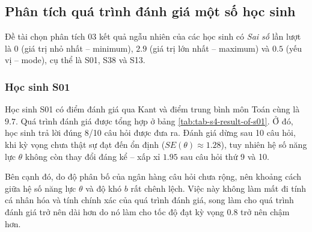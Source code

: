 \subsection{Phân tích quá trình đánh giá một số học sinh}

Đề tài chọn phân tích 03 kết quả ngẫu nhiên của các học sinh có \textit{Sai số} lần lượt là $0$ (giá trị nhỏ nhất – minimum), $2.9$ (giá trị lớn nhất – maximum) và $0.5$ (yếu vị – mode), cụ thể là S01, S38 và S13.\par

\subsubsection{Học sinh S01}

Học sinh S01 có điểm đánh giá qua Kant và điểm trung bình môn Toán cùng là $9.7$. Quá trình đánh giá được tổng hợp ở bảng \ref{tab:tab-s4-result-of-s01}. Ở đó, học sinh trả lời đúng 8/10 câu hỏi được đưa ra. Đánh giá dừng sau 10 câu hỏi, khi kỳ vọng chưa thật sự đạt đến ổn định ($SE(\theta)\approx 1.28$), tuy nhiên hệ số năng lực $\theta$ không còn thay đổi đáng kể – xấp xỉ $1.95$ sau câu hỏi thứ 9 và 10.\par

Bên cạnh đó, do độ phân bố của ngân hàng câu hỏi chưa rộng, nên khoảng cách giữa hệ số năng lực $\theta$ và độ khó $b$ rất chênh lệch. Việc này không làm mất đi tính cá nhân hóa và tính chính xác của quá trình đánh giá, song làm cho quá trình đánh giá trở nên dài hơn do nó làm cho tốc độ đạt kỳ vọng $0.8$ trở nên chậm hơn.\par

